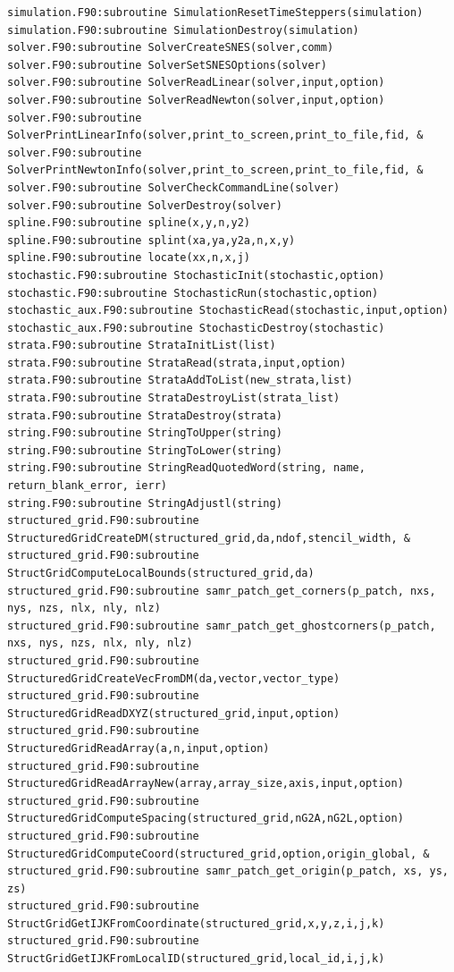 \documentclass[12pt]{article}
\begin{document}
\begin{verbatim}
simulation.F90:subroutine SimulationResetTimeSteppers(simulation)
simulation.F90:subroutine SimulationDestroy(simulation)
solver.F90:subroutine SolverCreateSNES(solver,comm)
solver.F90:subroutine SolverSetSNESOptions(solver)
solver.F90:subroutine SolverReadLinear(solver,input,option)
solver.F90:subroutine SolverReadNewton(solver,input,option)
solver.F90:subroutine SolverPrintLinearInfo(solver,print_to_screen,print_to_file,fid, &
solver.F90:subroutine SolverPrintNewtonInfo(solver,print_to_screen,print_to_file,fid, &
solver.F90:subroutine SolverCheckCommandLine(solver)
solver.F90:subroutine SolverDestroy(solver)
spline.F90:subroutine spline(x,y,n,y2)
spline.F90:subroutine splint(xa,ya,y2a,n,x,y)
spline.F90:subroutine locate(xx,n,x,j)
stochastic.F90:subroutine StochasticInit(stochastic,option)
stochastic.F90:subroutine StochasticRun(stochastic,option)
stochastic_aux.F90:subroutine StochasticRead(stochastic,input,option)
stochastic_aux.F90:subroutine StochasticDestroy(stochastic)
strata.F90:subroutine StrataInitList(list)
strata.F90:subroutine StrataRead(strata,input,option)
strata.F90:subroutine StrataAddToList(new_strata,list)
strata.F90:subroutine StrataDestroyList(strata_list)
strata.F90:subroutine StrataDestroy(strata)
string.F90:subroutine StringToUpper(string)
string.F90:subroutine StringToLower(string)
string.F90:subroutine StringReadQuotedWord(string, name, return_blank_error, ierr)
string.F90:subroutine StringAdjustl(string)
structured_grid.F90:subroutine StructuredGridCreateDM(structured_grid,da,ndof,stencil_width, &
structured_grid.F90:subroutine StructGridComputeLocalBounds(structured_grid,da)
structured_grid.F90:subroutine samr_patch_get_corners(p_patch, nxs, nys, nzs, nlx, nly, nlz)
structured_grid.F90:subroutine samr_patch_get_ghostcorners(p_patch, nxs, nys, nzs, nlx, nly, nlz)
structured_grid.F90:subroutine StructuredGridCreateVecFromDM(da,vector,vector_type)
structured_grid.F90:subroutine StructuredGridReadDXYZ(structured_grid,input,option)
structured_grid.F90:subroutine StructuredGridReadArray(a,n,input,option)
structured_grid.F90:subroutine StructuredGridReadArrayNew(array,array_size,axis,input,option)
structured_grid.F90:subroutine StructuredGridComputeSpacing(structured_grid,nG2A,nG2L,option)
structured_grid.F90:subroutine StructuredGridComputeCoord(structured_grid,option,origin_global, &
structured_grid.F90:subroutine samr_patch_get_origin(p_patch, xs, ys, zs)
structured_grid.F90:subroutine StructGridGetIJKFromCoordinate(structured_grid,x,y,z,i,j,k)
structured_grid.F90:subroutine StructGridGetIJKFromLocalID(structured_grid,local_id,i,j,k)

\end{verbatim}
\end{document}
